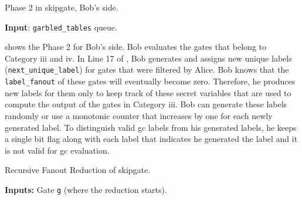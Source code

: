 \begin{algorithm}
\caption{Phase 2 in \gls{skipgate}, Bob's side.}\label{alg:phase2_bob}
\textbf{Input}: \texttt{garbled\_tables} queue.\\
\begin{algorithmic}[1]
		\ENDIF
	\ELSE {}
    \ELSE
    \ENDIF
	\ENDIF
\ENDFOR
\end{algorithmic}
\end{algorithm}

 shows the Phase 2 for Bob's side.
Bob evaluates the gates that belong to Category iii and iv.
In Line 17 of , Bob generates and assigns new unique labels (\texttt{next\_unique\_label}) for gates that were filtered by Alice.
Bob knows that the \texttt{label\_fanout} of these gates will eventually become zero.
Therefore, he produces new labels for them only to keep track of these secret variables that are used to compute the output of the gates in Category iii.
Bob can generate these labels randomly or use a monotonic counter that increases by one for each newly generated label.
To distinguish valid \acrshort{gc} labels from his generated labels, he keeps a single bit flag along with each label that indicates he generated the label and it is not valid for \acrshort{gc} evaluation.

\begin{algorithm}
\caption{Recursive Fanout Reduction of \gls{skipgate}.}\label{alg:skipgate_reduction}
\textbf{Inputs:} Gate \texttt{g} (where the reduction starts).\\
\begin{algorithmic}[1]
\ENDIF
{}
	\ENDIF
	\ENDIF
\ENDIF
\end{algorithmic}
\end{algorithm}


